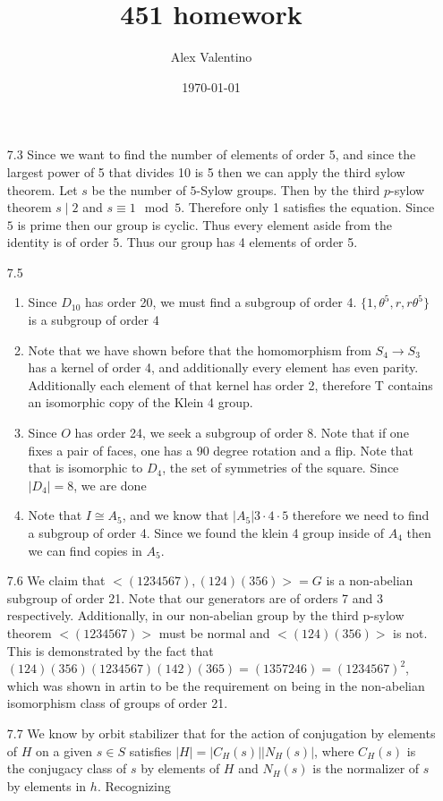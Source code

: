 \documentclass[12pt, letterpaper]{article}
\date{\today}
\author{Alex Valentino}
\title{451 homework}
\begin{document}
\begin{enumerate}
	\item[7.3] Since we want to find the number of elements of order 5, and since the largest power of 5 that divides 10 is 5 then we can apply the third sylow theorem.  Let $s$ be the number of $5$-Sylow groups.  Then by the third $p$-sylow theorem $s \mid 2$ and $s \equiv 1 \mod 5$.  Therefore
	only 1 satisfies the equation.  Since $5$ is prime then our group is cyclic.  Thus every element aside from the identity is of order 5.  Thus our 
	group has 4 elements of order 5. 
	\item[7.5]
	\begin{enumerate}
		\item Since $D_{10}$ has order 20, we must find a subgroup of order 4.  
		$\{1,\theta^5, r, r\theta^5 \}$ is a subgroup of order 4
		\item Note that we have shown before that the homomorphism from $S_4 \to S_3$ has a kernel of order 4, and additionally every element has even parity.  
		Additionally each element of that kernel has order 2, therefore T contains
		an isomorphic copy of the Klein 4 group.
		\item Since $O$ has order 24, we seek a subgroup of order 8. 
		Note that if one fixes a pair of faces, one has a 90 degree rotation and a 
		flip.  Note that that is isomorphic to $D_4$, the set of symmetries of the 
		square.  Since $|D_4| = 8$, we are done
		\item Note that $I \cong A_5$, and we know that $|A_5| 3 \cdot 4 \cdot 5$
		therefore we need to find a subgroup of order 4. Since we found the klein 4 group 	inside of $A_4$ then we can find copies in $A_5$.  
	\end{enumerate}
	\item[7.6] We claim that $<(1234567),(124)(356)> = G$ is a non-abelian subgroup of order 21.  Note that our generators are of orders 7 and 3 respectively.  Additionally, in our non-abelian group by the third p-sylow theorem $<(1234567)>$ must be normal and $<(124)(356)>$ is not.  This is demonstrated by the fact that $(124)(356)(1234567)(142)(365) = (1357246) = (1234567)^2$, which was shown in artin to be the requirement on being in the 
	non-abelian isomorphism class of groups of order 21.  
	\item[7.7] We know by orbit stabilizer that for the action of conjugation by elements of $H$ on a given $s \in S$ satisfies $|H| = |C_H(s)||N_H(s)|$, where $C_H(s)$ is the conjugacy class of $s$ by elements of $H$ and 
	$N_H(s)$ is the normalizer of $s$ by elements in $h$.  Recognizing 

\end{enumerate}
\end{document}
